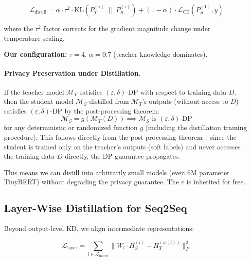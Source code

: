 \documentclass[11pt, a4paper]{article}
\newcommand{\eps}{\varepsilon}
\begin{document}
\begin{equation}
\mathcal{L}_{\text{distill}} = \alpha \cdot \tau^2 \cdot \text{KL}\!\left(P_T^{(\tau)} \;\|\; P_S^{(\tau)}\right) + (1 - \alpha) \cdot \mathcal{L}_{\text{CE}}(P_S^{(1)}, y)
\end{equation}

where the $\tau^2$ factor corrects for the gradient magnitude change under temperature scaling.

\textbf{Our configuration:} $\tau = 4$, $\alpha = 0.7$ (teacher knowledge dominates).

\paragraph{Privacy Preservation under Distillation.}
If the teacher model $\mathcal{M}_T$ satisfies $(\eps, \delta)$-DP with respect to training data $D$, then the student model $\mathcal{M}_S$ distilled from $\mathcal{M}_T$'s outputs (without access to $D$) satisfies $(\eps, \delta)$-DP by the post-processing theorem:
\begin{equation}
\mathcal{M}_S = g(\mathcal{M}_T(D)) \implies \mathcal{M}_S \text{ is } (\eps, \delta)\text{-DP}
\end{equation}
for any deterministic or randomized function $g$ (including the distillation training procedure). This follows directly from the post-processing theorem~\cite{dwork2014algorithmic}: since the student is trained only on the teacher's outputs (soft labels) and never accesses the training data $D$ directly, the DP guarantee propagates.

\begin{keyresult}
This means we can distill into arbitrarily small models (even 6M parameter TinyBERT) without degrading the privacy guarantee. The $\eps$ is inherited for free.
\end{keyresult}

\subsection{Layer-Wise Distillation for Seq2Seq}

Beyond output-level KD, we align intermediate representations:

\begin{equation}
\mathcal{L}_{\text{layer}} = \sum_{l \in \mathcal{L}_{\text{match}}} \| W_l \cdot H_S^{(l)} - H_T^{(\psi(l))} \|_F^2
\end{equation}
\end{document}
